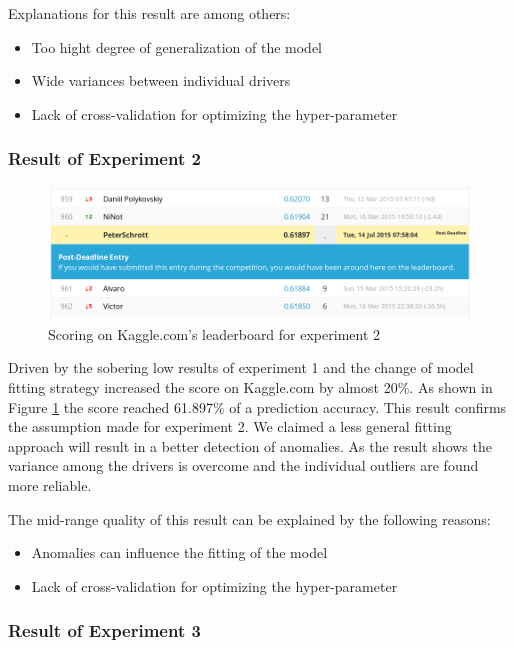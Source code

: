 \documentclass{vldb}
\begin{document}
Explanations for this result are among others:
\begin{itemize}
\item Too hight degree of generalization of the model
\item Wide variances between individual drivers
\item Lack of cross-validation for optimizing the hyper-pa\-ra\-me\-ter
\end{itemize}

\subsubsection*{Result of Experiment 2}
\label{ssubsec:Res-e2}

\begin{figure}
\centering
\includegraphics[width=\linewidth]{"pics/kaggle-result-2"}
\caption{Scoring on Kaggle.com's leaderboard for experiment 2}
\label{fig:kaggle-result2}
\end{figure}

Driven by the sobering low results of experiment 1 and the change of model fitting strategy increased the score on Kaggle.com by almost 20\%. As shown in Figure \ref{fig:kaggle-result2} the score reached 61.897\% of a prediction accuracy. This result confirms the assumption made for experiment 2. We claimed a less general fitting approach will result in a better detection of anomalies. As the result shows the variance among the drivers is overcome and the individual outliers are found more reliable.

The mid-range quality of this result can be explained by the following reasons:
\begin{itemize}
\item Anomalies can influence the fitting of the model
\item Lack of cross-validation for optimizing the hyper-pa\-ra\-me\-ter
\end{itemize}

\subsubsection*{Result of Experiment 3}
\label{ssubsec:Res-e3}
\end{document}
